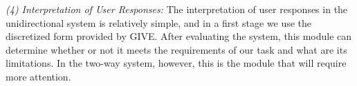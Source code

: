 \emph{(4) Interpretation of User Responses:} The interpretation of user
responses in the unidirectional system is relatively simple, and in a first
stage we use the discretized form provided by GIVE. After evaluating the system,
this module can determine whether or not it meets the requirements of our task
and what are its limitations. In the two-way system, however, this is the module
that will require more attention.
% 


